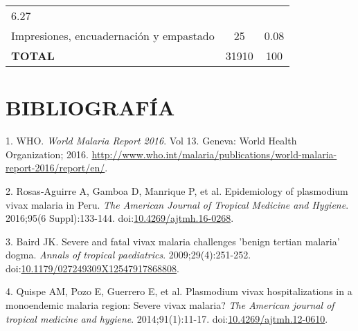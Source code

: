 \documentclass[a4paper]{article}
\begin{document}
\begin{longtable}[]{@{}lcc@{}}
\begin{minipage}[t]{0.22\columnwidth}
6.27\strut
\end{minipage}\tabularnewline
\begin{minipage}[t]{0.46\columnwidth}\raggedright\strut
Impresiones, encuadernación y empastado\strut
\end{minipage} & \begin{minipage}[t]{0.22\columnwidth}\centering\strut
25\strut
\end{minipage} & \begin{minipage}[t]{0.22\columnwidth}\centering\strut
0.08\strut
\end{minipage}\tabularnewline
\begin{minipage}[t]{0.46\columnwidth}\raggedright\strut
\textbf{TOTAL}\strut
\end{minipage} & \begin{minipage}[t]{0.22\columnwidth}\centering\strut
31910\strut
\end{minipage} & \begin{minipage}[t]{0.22\columnwidth}\centering\strut
100\strut
\end{minipage}\tabularnewline
\bottomrule
\end{longtable}

\section{BIBLIOGRAFÍA}\label{bibliografia}

\hypertarget{refs}{}
\hypertarget{ref-WHO2016world}{}
1. WHO. \emph{World Malaria Report 2016}. Vol 13. Geneva: World Health
Organization; 2016.
\url{http://www.who.int/malaria/publications/world-malaria-report-2016/report/en/}.

\hypertarget{ref-rosas2016peru}{}
2. Rosas-Aguirre A, Gamboa D, Manrique P, et al. Epidemiology of
plasmodium vivax malaria in Peru. \emph{The American Journal of Tropical
Medicine and Hygiene}. 2016;95(6 Suppl):133-144.
doi:\href{https://doi.org/10.4269/ajtmh.16-0268}{10.4269/ajtmh.16-0268}.

\hypertarget{ref-baird2009}{}
3. Baird JK. Severe and fatal vivax malaria challenges 'benign tertian
malaria' dogma. \emph{Annals of tropical paediatrics}.
2009;29(4):251-252.
doi:\href{https://doi.org/10.1179/027249309X12547917868808}{10.1179/027249309X12547917868808}.

\hypertarget{ref-quispe2014}{}
4. Quispe AM, Pozo E, Guerrero E, et al. Plasmodium vivax
hospitalizations in a monoendemic malaria region: Severe vivax malaria?
\emph{The American journal of tropical medicine and hygiene}.
2014;91(1):11-17.
doi:\href{https://doi.org/10.4269/ajtmh.12-0610}{10.4269/ajtmh.12-0610}.
\end{document}
